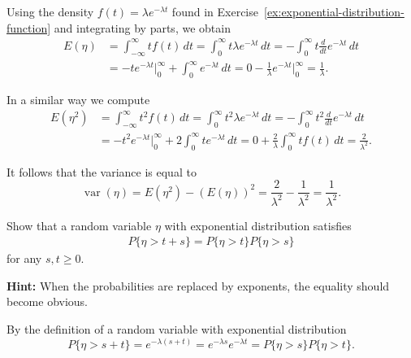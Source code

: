\begin{Solution}
Using the density $f(t) = \lambda e^{-\lambda t}$ found in Exercise~\ref{ex:exponential-distribution-function} and integrating by parts, we obtain
\begin{equation}
\begin{aligned}
E(\eta) &= \int_{-\infty}^{\infty} t f(t) \, dt = \int_0^{\infty} t \lambda e^{-\lambda t} \, dt = -\int_0^{\infty} t \frac{d}{dt} e^{-\lambda t} \, dt \\
&= -t e^{-\lambda t}\Big|_0^{\infty} + \int_0^{\infty} e^{-\lambda t} \, dt = 0 - \frac{1}{\lambda} e^{-\lambda t}\Big|_0^{\infty} = \frac{1}{\lambda}.
\end{aligned}
\label{eq:exponential-expectation}
\end{equation}

In a similar way we compute
\begin{equation}
\begin{aligned}
E(\eta^2) &= \int_{-\infty}^{\infty} t^2 f(t) \, dt = \int_0^{\infty} t^2 \lambda e^{-\lambda t} \, dt = -\int_0^{\infty} t^2 \frac{d}{dt} e^{-\lambda t} \, dt \\
&= -t^2 e^{-\lambda t}\Big|_0^{\infty} + 2\int_0^{\infty} t e^{-\lambda t} \, dt = 0 + \frac{2}{\lambda} \int_0^{\infty} t f(t) \, dt = \frac{2}{\lambda^2}.
\end{aligned}
\label{eq:exponential-second-moment}
\end{equation}

It follows that the variance is equal to
\begin{equation}
\operatorname{var}(\eta) = E(\eta^2) - (E(\eta))^2 = \frac{2}{\lambda^2} - \frac{1}{\lambda^2} = \frac{1}{\lambda^2}.
\label{eq:exponential-variance}
\end{equation}
\end{Solution}

\begin{Exercise}
\label{ex:exponential-functional-equation}
Show that a random variable $\eta$ with exponential distribution satisfies
\begin{align}
P\{\eta > t + s\} = P\{\eta > t\} P\{\eta > s\} \tag{6.1}
\label{eq:exponential-functional-equation}
\end{align}
for any $s, t \geq 0$.

\noindent\textbf{Hint:} When the probabilities are replaced by exponents, the equality should become obvious.
\end{Exercise}

\begin{Solution}
By the definition of a random variable with exponential distribution
\[
P\{\eta > s + t\} = e^{-\lambda(s+t)} = e^{-\lambda s} e^{-\lambda t} = P\{\eta > s\} P\{\eta > t\}.
\]
\end{Solution}

